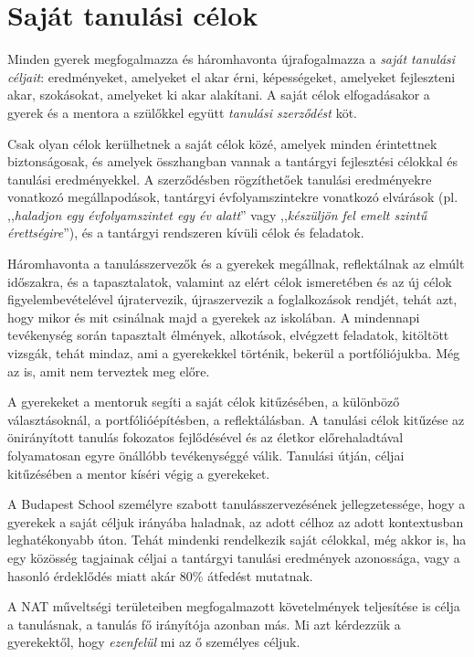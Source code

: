 \section{Saját tanulási célok}
\label{sec:tanulasi_celok}

Minden gyerek megfogalmazza és háromhavonta újrafogalmazza a \emph{saját tanulási céljait}: eredményeket, amelyeket el akar érni, képességeket, amelyeket fejleszteni akar, szokásokat, amelyeket ki akar alakítani. A saját célok elfogadásakor a gyerek és a mentora a szülőkkel együtt \emph{tanulási szerződést} köt.

Csak olyan célok kerülhetnek a saját célok közé, amelyek minden érintettnek biztonságosak, és amelyek összhangban vannak a tantárgyi fejlesztési célokkal és tanulási eredményekkel. A szerződésben rögzíthetőek tanulási eredményekre vonatkozó megállapodások, tantárgyi évfolyamszintekre vonatkozó elvárások (pl. ,,\emph{haladjon egy évfolyamszintet egy év alatt}'' vagy ,,\emph{készüljön fel emelt szintű érettségire}''), és a tantárgyi rendszeren kívüli célok és feladatok.


Háromhavonta a tanulásszervezők és a gyerekek megállnak, reflektálnak az elmúlt időszakra, és a tapasztalatok, valamint az elért célok ismeretében és az új célok figyelembevételével újratervezik, újraszervezik a foglalkozások rendjét, tehát azt, hogy mikor és mit csinálnak majd a gyerekek az iskolában. A mindennapi tevékenység során tapasztalt élmények, alkotások, elvégzett feladatok, kitöltött vizsgák, tehát mindaz, ami a gyerekekkel történik, bekerül a portfóliójukba. Még az is, amit nem terveztek meg előre.

A gyerekeket a mentoruk segíti a saját célok kitűzésében, a különböző választásoknál, a portfólióépítésben, a reflektálásban. A tanulási célok kitűzése az önirányított tanulás fokozatos fejlődésével és az életkor előrehaladtával folyamatosan egyre önállóbb tevékenységgé válik. Tanulási útján, céljai kitűzésében a mentor kíséri végig a gyerekeket.

A Budapest School személyre szabott tanulásszervezésének jellegzetessége, hogy a gyerekek a saját céljuk irányába haladnak, az adott célhoz az adott kontextusban leghatékonyabb úton. Tehát mindenki rendelkezik saját célokkal, még akkor is, ha egy közösség tagjainak céljai a tantárgyi tanulási eredmények azonossága, vagy a hasonló érdeklődés miatt akár  80\% átfedést mutatnak.

A NAT műveltségi területeiben megfogalmazott követelmények teljesítése is célja a tanulásnak, a tanulás fő irányítója azonban más. Mi azt kérdezzük a gyerekektől, hogy \emph{ezenfelül} mi az ő személyes céljuk.